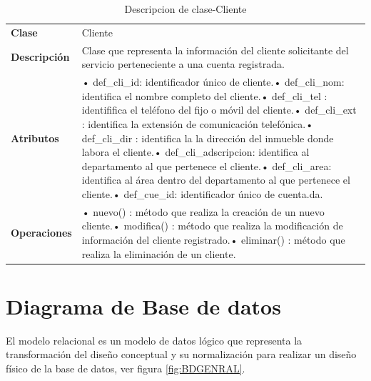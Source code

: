 \begin{table}[H]
	\centering
	\caption{Descripcion de clase-Cliente}
	\begin{tabular}{|p{6.145em}|p{28.07em}|}
		\toprule
		\rowcolor[rgb]{ .125,  .216,  .392} \multicolumn{2}{|p{34.215em}|}{\textcolor[rgb]{ 1,  1,  1}{\textbf{Clase Cliente   }}} \\
		\midrule
		\textbf{Clase} & \multicolumn{1}{l|}{Cliente   } \\
		\midrule
		\textbf{Descripción} & Clase que representa la información del cliente solicitante del servicio perteneciente a una cuenta registrada.  \\
		\midrule
		\textbf{Atributos } & •	def\_cli\_id: identificador único de cliente.\newline{}•	def\_cli\_nom: identifica el nombre completo del cliente.\newline{}•	def\_cli\_tel : identififica el teléfono del fijo o móvil del cliente.\newline{}•	def\_cli\_ext : identifica la extensión de comunicación telefónica.\newline{}•	def\_cli\_dir : identifica la la dirección del inmueble donde labora el cliente.\newline{}•	def\_cli\_adscripcion: identifica al departamento al que pertenece el cliente.\newline{}•	def\_cli\_area: identifica al área dentro del departamento al que pertenece el cliente.\newline{}•	def\_cue\_id: identificador único de cuenta.da. \\
		\midrule
		\textbf{Operaciones} & •	nuevo()  :  método que realiza la creación de un nuevo cliente.\newline{}•	modifica() : método que  realiza la modificación de información del cliente registrado.\newline{}•	eliminar() : método que realiza la eliminación de un cliente. \\
		\bottomrule
	\end{tabular}%
	\label{tab:class18}%
\end{table}%

\newpage
\section{Diagrama de Base de datos}
El modelo relacional es un modelo de datos lógico que representa la transformación del 
diseño conceptual y su normalización para realizar un diseño físico de la base de datos, ver figura \ref{fig:BDGENRAL}. 


